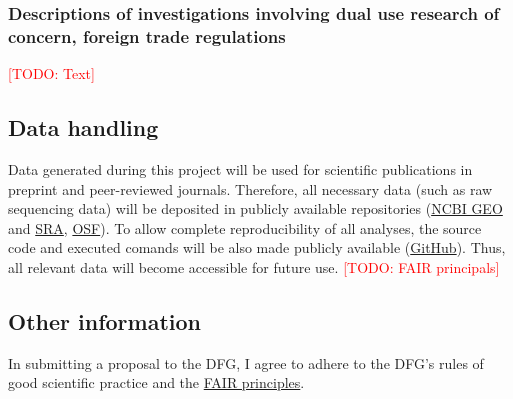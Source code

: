 \documentclass[american,firsttime]{dfgproposal}
\newcommand{\todo}[1]{\xspace{\textcolor{red}{[TODO: #1]}}\xspace}
\begin{document}
	\subsubsection{Descriptions of investigations involving dual use research of concern, foreign trade regulations}
	\todo{Text}
	
	
	\subsection{Data handling}
	Data generated during this project will be used for scientific publications in
	preprint and peer-reviewed journals. Therefore, all necessary data (such as raw
	sequencing data) will be deposited in publicly available repositories
	(\href{https://www.ncbi.nlm.nih.gov/geo/}{NCBI GEO} and
	\href{https://www.ncbi.nlm.nih.gov/sra}{SRA}, \href{https://osf.io/}{OSF}). To
	allow complete reproducibility of all analyses, the source code and executed
	comands will be also made publicly available
	(\href{https://github.com/}{GitHub}).  Thus, all relevant data will become
	accessible for future use. 
	\todo{FAIR principals}
	
	\subsection{Other information}
	In submitting a proposal to the DFG, I agree to adhere to the DFG's rules of good scientific practice and the \href{https://www.nature.com/articles/sdata201618}{FAIR principles}.
	
	
	
\end{document}
